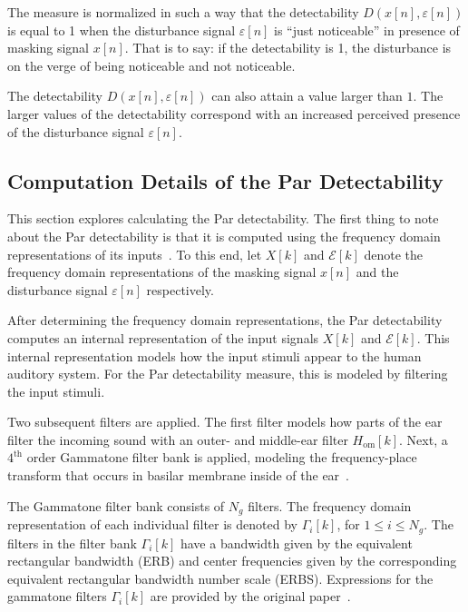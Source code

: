 The measure is normalized in such a way that the detectability $D(x[n],\varepsilon[n])$ is equal to 1 when the 
disturbance signal $\varepsilon[n]$ is ``just noticeable'' in presence of masking signal $x[n]$.
That is to say: if the detectability is 1, the disturbance is on the verge of being noticeable and not noticeable.

The detectability $D(x[n],\varepsilon[n])$ can also attain a value larger than $1$.
The larger values of the detectability correspond with an increased perceived presence of the
disturbance signal $\varepsilon[n]$.

\subsection{Computation Details of the Par Detectability}
\label{ch:perceptual:implementation:computation}
This section explores calculating the Par detectability.
The first thing to note about the Par detectability is that it is computed using the frequency domain representations of its inputs~\cite{van2005perceptual}. 
To this end, let $X[k]$ and $\mathcal{E}[k]$ denote the frequency domain representations of the masking signal $x[n]$ and 
the disturbance signal $\varepsilon[n]$ respectively.

After determining the frequency domain representations, 
the Par detectability computes an internal representation of the input signals $X[k]$ and $\mathcal{E}[k]$.
This internal representation models how the input stimuli appear to the human auditory system.
For the Par detectability measure, this is modeled by filtering the input stimuli.

Two subsequent filters are applied.
The first filter models how parts of the ear filter the incoming sound with an outer- and middle-ear filter $H_\text{om}[k]$. 
Next, a $4^\text{th}$ order Gammatone filter bank is applied, modeling the frequency-place transform that occurs in 
basilar membrane inside of the ear~\cite{van2005perceptual}.

The Gammatone filter bank consists of $N_g$ filters.
The frequency domain representation of each individual filter is denoted by $\Gamma_i[k]$, for $1 \leq i \leq N_g$. 
The filters in the filter bank $\Gamma_i[k]$ have a bandwidth given by the equivalent 
rectangular bandwidth (ERB) and center frequencies given by the corresponding equivalent rectangular bandwidth number
scale (ERBS).
Expressions for the gammatone filters $\Gamma_i[k]$ are provided by the original paper~\cite{van2005perceptual}.

